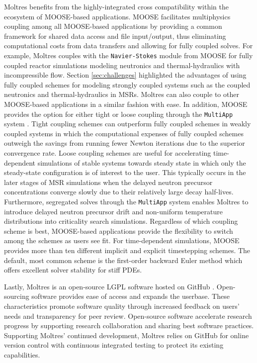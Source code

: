 Moltres benefits from the highly-integrated cross compatibility within the
ecosystem of MOOSE-based applications. MOOSE facilitates multiphysics coupling
among all MOOSE-based applications by providing a common framework for shared
data access and file input/output, thus eliminating computational costs from
data transfers and allowing for fully coupled solves. For example, Moltres
couples with the \texttt{Navier-Stokes} module \cite{peterson_overview_2018}
from MOOSE for fully coupled reactor simulations modeling neutronics and
thermal-hydraulics with incompressible flow. Section
\ref{sec:challenges} highlighted the advantages of using fully coupled schemes
for modeling strongly coupled systems such as the coupled
neutronics and thermal-hydraulics in \glspl{MSR}. Moltres can also
couple to other MOOSE-based applications in a similar fashion with ease. In
addition, MOOSE
provides the option for either tight or loose coupling through the
\texttt{MultiApp} system \cite{gaston_physics-based_2015}. Tight coupling
schemes can outperform fully coupled schemes in weakly coupled systems in which
the computational expenses of fully coupled schemes outweigh the savings from
running fewer Newton iterations due to the superior convergence rate. Loose
coupling schemes are useful for accelerating time-dependent simulations of
stable systems towards steady state in which only the steady-state
configuration is of interest to the user. This typically occurs in the later
stages of \gls{MSR} simulations when the delayed neutron precursor
concentrations converge slowly due to their relatively large decay half-lives.
Furthermore, segregated solves through the \texttt{MultiApp} system enables
Moltres to introduce delayed neutron precursor drift and non-uniform
temperature distributions into criticality search simulations. Regardless of
which coupling scheme is best, MOOSE-based applications provide the flexibility
to switch among the schemes as users see fit. For time-dependent simulations,
MOOSE provides more than ten different implicit and explicit timestepping
schemes. The default, most common scheme is the first-order backward Euler
method which offers excellent solver stability for stiff \glspl{PDE}.

Lastly, Moltres is an open-source \gls{LGPL} software hosted on
GitHub \cite{github_build_2017}. Open-sourcing software provides ease of access
and expands the userbase. These characteristics promote software quality
through increased feedback on users' needs and transparency for peer review.
Open-source software accelerate research progress by supporting research
collaboration and sharing best software practices. Supporting Moltres'
continued development, Moltres relies on GitHub for online version control with
continuous integrated testing to protect its existing capabilities.

